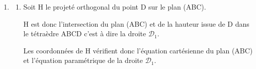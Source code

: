 \documentclass[10pt]{article}
\begin{document}
\begin{enumerate}
\begin{enumerate}
(S) $\Longleftrightarrow \begin{cases} t =1+3s \\ 3  \times (1+3s)=-1-5s \\ 3+5 \times ( 1+3s)=2-6s  \end{cases}  \Longleftrightarrow  \begin{cases} t =1+3s \\ 3+9s=-1-5s \\ 3+5+15s=2-6s  \end{cases}$

(S) $\Longleftrightarrow  \begin{cases} t =1+3s \\ 14s=-4\\ 21s=-6  \end{cases} \Longleftrightarrow  \begin{cases} t =1+3s = 1 + 3\times \dfrac{-2}{7}= \dfrac{1}{7} \\ s=-\dfrac{4}{14}=-\dfrac{2}{7}\\ s=-\dfrac{6}{21} =-\dfrac{2}{7} \end{cases} $

Le système admet une unique solution donc les droites $\mathcal{D}_{1}$ et $\mathcal{D}_{2}$   sont sécantes.


Remplaçons $t$ par $\dfrac{1}{7}$ dans l'équation paramétrique de $\mathcal{D}_{1}$

			  $\begin{cases} x= \dfrac{1}{7}\\ y=3 \times \dfrac{1}{7} = \dfrac{3}{7} \\ z=3+5 \times \dfrac{1}{7}  = \dfrac{26}{7} \end{cases} $

Les droites $\mathcal{D}_{1}$ et $\mathcal{D}_{2}$ sont donc sécantes et  les coordonnées de leur point d'intersection sont $\left( \dfrac{1}{7}~;~\dfrac{3}{7}~;~\dfrac{26}{7}\right)$.
\end{enumerate}
	\item
		\begin{enumerate}
		\item  Soit H le projeté orthogonal  du point D sur le plan (ABC).

H est donc l'intersection du plan (ABC) et de la hauteur issue de D dans le tétraèdre ABCD c'est à dire la droite $\mathcal{D}_{1}$.

Les coordonnées de H vérifient donc l'équation cartésienne du plan (ABC) et l'équation paramétrique de la droite  $\mathcal{D}_{1}$.


\end{enumerate}
\end{enumerate}
\end{document}
